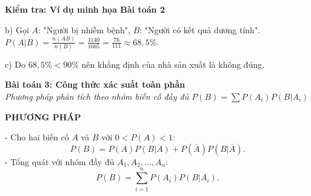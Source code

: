 \documentclass[12pt,a4paper]{article}
\newenvironment{lesson}[2]{
	\noindent\textbf{\Large #1}\\
	\textit{#2}
}{}
\newenvironment{quiz}[1]{
	\noindent\textbf{\Large Kiểm tra: #1}
}{}
\begin{document}
\begin{quiz}{Ví dụ minh họa Bài toán 2}
{b) Gọi $A$: "Người bị nhiễm bệnh", $B$: "Người có kết quả dương tính".
$P(A|B) = \frac{n(AB)}{n(B)} = \frac{1140}{1665} = \frac{76}{111} \approx 68{,}5\%$.

c) Do $68{,}5\% < 90\%$ nên khẳng định của nhà sản xuất là không đúng.}

\end{quiz}

\begin{lesson}{Bài toán 3: Công thức xác suất toàn phần}{Phương pháp phân tích theo nhóm biến cố đầy đủ $P(B) = \sum P(A_i)P(B|A_i)$}

\textbf{PHƯƠNG PHÁP}

- Cho hai biến cố $A$ và $B$ với $0 < P(A) < 1$:
  $$P(B) = P(A)P(B|A) + P(\overline{A})P(B|\overline{A}).$$
- Tổng quát với nhóm đầy đủ $A_1, A_2, \dots, A_n$:
  $$P(B) = \sum_{i=1}^n P(A_i)P(B|A_i).$$

\end{lesson}
\end{document}

